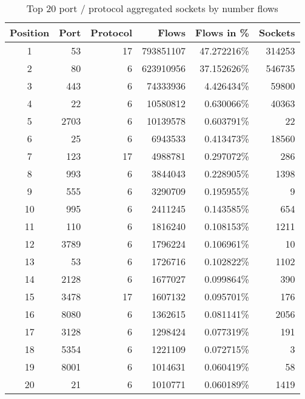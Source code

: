 \begin{table}[ht]
	\centering
\begin{tabular}{|c|r|r|r|r|r|}
\hline
\textbf{Position} & \textbf{Port} & \textbf{Protocol} & \textbf{Flows} &\textbf{ Flows in \%} & \textbf{Sockets}\\
\hline \hline
1  &	53		& 17 &	793851107 & 47.272216\% & 314253\\ \hline
2  &   	80		& 6	 &	623910956 & 37.152626\% & 546735\\ \hline
3  &  	443     & 6  &	74333936 & 4.426434\% & 59800\\ \hline
4  &	22      & 6  &	10580812 & 0.630066\% & 40363\\ \hline
5  & 	2703    & 6  &	10139578 & 0.603791\% & 22\\ \hline
6  &	25      & 6  &	6943533 & 0.413473\% & 18560\\ \hline
7  &	123     & 17 & 	4988781 & 0.297072\% & 286\\ \hline
8  &	993     & 6  &	3844043 & 0.228905\% & 1398\\ \hline
9  &	555     & 6  &	3290709 & 0.195955\% & 9\\ \hline
10 &	995     & 6  &	2411245 & 0.143585\% & 654\\ \hline
11 &   	110     & 6  &	1816240 & 0.108153\% & 1211\\ \hline
12 &	3789    & 6  &	1796224 & 0.106961\% & 10\\ \hline
13 &    53      & 6  &	1726716 & 0.102822\% & 1102\\ \hline
14 &	2128    & 6  &	1677027 & 0.099864\% & 390\\ \hline
15 &	3478    & 17 &	1607132 & 0.095701\% & 176\\ \hline
16 &	8080    & 6  &	1362615 & 0.081141\% & 2056\\ \hline
17 &	3128    & 6  & 	1298424 & 0.077319\% & 191\\ \hline
18 &	5354    & 6  &	1221109 & 0.072715\% & 3\\ \hline
19 &	8001    & 6  & 	1014631 & 0.060419\% & 58\\ \hline
20 &	21      & 6  & 	1010771 & 0.060189\% & 1419\\ \hline
\end{tabular}
\caption{Top 20 port / protocol aggregated sockets by number flows}
\end{table}

